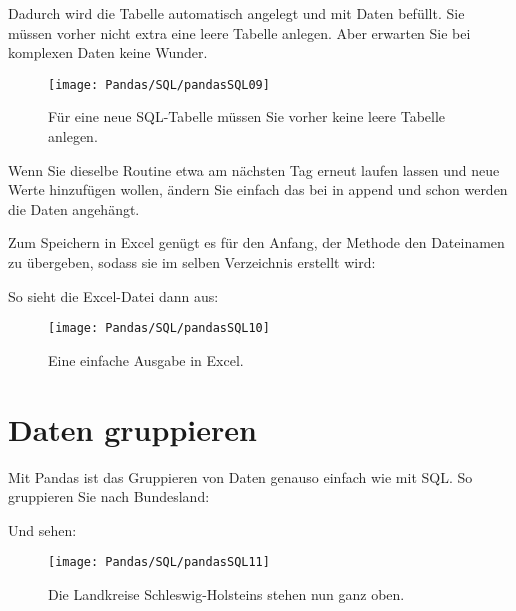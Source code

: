 
\medskip

Dadurch wird die Tabelle automatisch angelegt und mit Daten befüllt. Sie müssen vorher nicht extra eine leere Tabelle anlegen. Aber erwarten Sie bei komplexen Daten keine Wunder.

\begin{figure}
	\texttt{[image: Pandas/SQL/pandasSQL09]}
	\caption{Für eine neue SQL-Tabelle müssen Sie vorher keine leere Tabelle anlegen.}
\end{figure}

Wenn Sie dieselbe Routine etwa am nächsten Tag erneut laufen lassen und neue Werte hinzufügen wollen, ändern Sie einfach das  bei  in append und schon werden die Daten angehängt.

Zum Speichern in Excel genügt es für den Anfang, der Methode  den Dateinamen zu übergeben, sodass sie im selben Verzeichnis erstellt wird:

\medskip



\medskip

So sieht die Excel-Datei dann aus:

\begin{figure}
	\texttt{[image: Pandas/SQL/pandasSQL10]}
	\caption{Eine einfache Ausgabe in Excel.}
\end{figure}

\section{Daten gruppieren}

Mit Pandas ist das Gruppieren von Daten genauso einfach wie mit SQL. So gruppieren Sie nach Bundesland:

\medskip



\medskip

Und sehen:

\begin{figure}
	\texttt{[image: Pandas/SQL/pandasSQL11]}
	\caption{Die Landkreise Schleswig-Holsteins stehen nun ganz oben.}
\end{figure}

